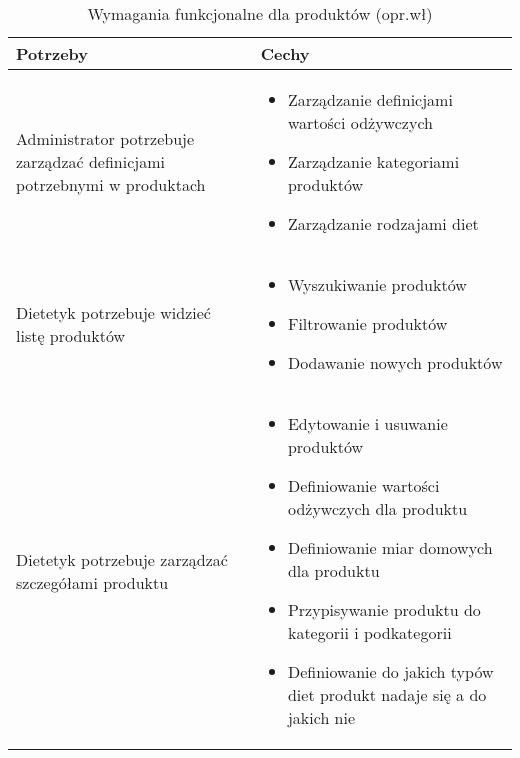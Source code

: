\begin{minipage}{\textwidth}
    \begin{table}[H]
        \centering\caption{Wymagania funkcjonalne dla produktów (opr.wł)\label{tabela:wymaganiaFunkcjonalneProdukty}}
        \begin{tabular}{|p{}|p{}|}
            \hline
            Potrzeby & Cechy \\

            \hline
            Administrator potrzebuje zarządzać definicjami potrzebnymi w produktach &
            \begin{itemize}
                \item Zarządzanie definicjami wartości odżywczych
                \item Zarządzanie kategoriami produktów
                \item Zarządzanie rodzajami diet
            \end{itemize} \\
            \hline
            Dietetyk potrzebuje widzieć listę produktów &
            \begin{itemize}
                \item Wyszukiwanie produktów
                \item Filtrowanie produktów
                \item Dodawanie nowych produktów
            \end{itemize} \\
            \hline
            Dietetyk potrzebuje zarządzać szczegółami produktu &
            \begin{itemize}
                \item Edytowanie i usuwanie produktów
                \item Definiowanie wartości odżywczych dla produktu
                \item Definiowanie miar domowych dla produktu
                \item Przypisywanie produktu do kategorii i podkategorii
                \item Definiowanie do jakich typów diet produkt nadaje się a do jakich nie
            \end{itemize} \\
            \hline
        \end{tabular}
    \end{table}
\end{minipage}

